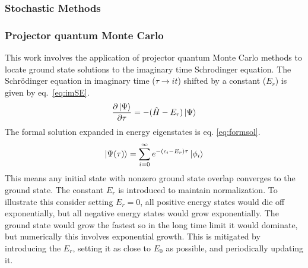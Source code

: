 \subsubsection{Stochastic Methods}

\subsubsection{Projector quantum Monte Carlo}
This work involves the application of projector quantum Monte Carlo methods to locate ground state solutions to the imaginary time Schrodinger equation.
The Schr{\"o}dinger equation in imaginary time ($\tau\rightarrow it$) shifted by a constant ($E_r$) is given by eq.~\ref{eq:imSE}.
\begin{equation}
\frac{\partial \ket{\Psi}}{\partial \tau} = - (\hat{H} - E_r) \ket{\Psi}
    \label{eq:imSE}
\end{equation}
The formal solution expanded in energy eigenstates is eq. \ref{eq:formsol}.
\begin{equation}
\ket{\Psi(\tau)} = \sum_{i=0}^{\infty} e^{-(\epsilon_i - E_r) \tau} \ket{\phi_i}
    \label{eq:formsol}
\end{equation}
This means any initial state with nonzero ground state overlap converges to the ground state.
The constant $E_r$ is introduced to maintain normalization. 
To illustrate this consider setting $E_r = 0$, all positive energy states would die off exponentially, but all negative energy states would grow exponentially.
The ground state would grow the fastest so in the long time limit it would dominate, but numerically this involves exponential growth.
This is mitigated by introducing the $E_r$, setting it as close to $E_0$ as possible, and periodically updating it.


